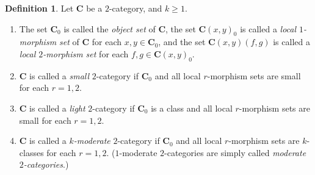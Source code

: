 \documentclass{surv-l}
\numberwithin{equation}{chapter}
\numberwithin{figure}{chapter}
\theoremstyle{plain}
\theoremstyle{definition}
\newtheorem{dfn}[thm]{Definition}
\theoremstyle{remark}
\begin{document}
\begin{dfn}
Let $\mathbf{C}$ be a $2$-category, and $k \ge 1$.
\begin{enumerate}
\item
The set $\mathbf{C}_0$ is called the \emph{object set} of $\mathbf{C}$,
the set $\mathbf{C}(x, y)_0$ is called a \emph{local $1$-morphism set} of $\mathbf{C}$
for each $x, y \in \mathbf{C}_0$, and
the set $\mathbf{C}(x,y)(f,g)$ is called a \emph{local $2$-morphism set} for each $f,g \in \mathbf{C}(x,y)_0$.
\item
$\mathbf{C}$ is called a \emph{small} $2$-category if
$\mathbf{C}_0$ and all local $r$-morphism sets are small
for each $r= 1,2$.
\item
$\mathbf{C}$ is called a \emph{light} $2$-category if
$\mathbf{C}_0$ is a class and all local $r$-morphism sets are small
for each $r= 1,2$.
\item
$\mathbf{C}$ is called a \emph{$k$-moderate} $2$-category if
$\mathbf{C}_0$ and all local $r$-morphism sets are $k$-classes
for each $r= 1,2$.
($1$-moderate $2$-categories are simply called \emph{moderate $2$-categories}.)
\end{enumerate}
\end{dfn}
\end{document}
